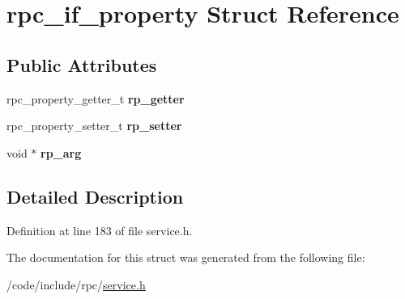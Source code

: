\hypertarget{structrpc__if__property}{}\section{rpc\+\_\+if\+\_\+property Struct Reference}
\label{structrpc__if__property}
\subsection*{Public Attributes}
\begin{DoxyCompactItemize}
\item 
rpc\+\_\+property\+\_\+getter\+\_\+t {\bfseries rp\+\_\+getter}\hypertarget{structrpc__if__property_a6b88200bb991311dae3c05e92dc16fdc}{}\label{structrpc__if__property_a6b88200bb991311dae3c05e92dc16fdc}

\item 
rpc\+\_\+property\+\_\+setter\+\_\+t {\bfseries rp\+\_\+setter}\hypertarget{structrpc__if__property_ab095fba7efd97b90f3440c2db5369f1e}{}\label{structrpc__if__property_ab095fba7efd97b90f3440c2db5369f1e}

\item 
void $\ast$ {\bfseries rp\+\_\+arg}\hypertarget{structrpc__if__property_a0171db6c0ee6ad206634d42de210ae52}{}\label{structrpc__if__property_a0171db6c0ee6ad206634d42de210ae52}

\end{DoxyCompactItemize}


\subsection{Detailed Description}


Definition at line 183 of file service.\+h.



The documentation for this struct was generated from the following file\+:\begin{DoxyCompactItemize}
\item 
/code/include/rpc/\hyperlink{service_8h}{service.\+h}\end{DoxyCompactItemize}
